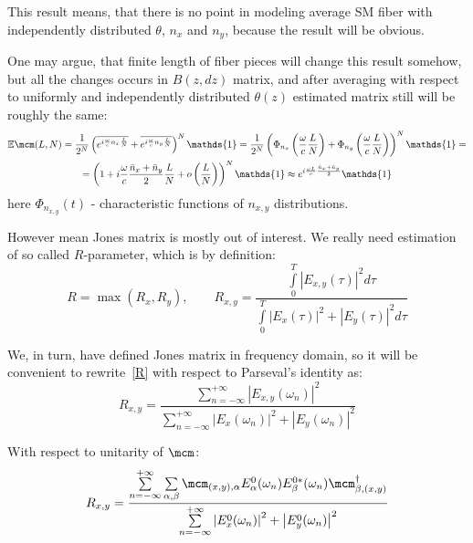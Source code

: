 \documentclass[12pt, notitlepage]{report}
\begin{document}
\label{problem}
This result means, that there is no point in modeling average SM fiber with independently distributed $\theta$, $n_x$ and $n_y$, because the result will be obvious. 

One may argue, that finite length of fiber pieces will change this result somehow, but all the changes occurs in $B(z,dz)$ matrix, and after averaging with respect to uniformly and independently distributed $\theta(z)$ estimated matrix still will be roughly the same:
\begin{multline*}
	\mathbb{E}\mcm(L, N) = \dfrac{1}{2^N} \left( \overline{e^{i\frac{\omega}{c}n_x\frac{L}{N}}} + \overline{e^{i\frac{\omega}{c}n_y\frac{L}{N}}}\right)^N \mathds{1} = \dfrac{1}{2^N} \left( \Phi_{n_x}\left(\frac{\omega}{c}\frac{L}{N}\right) + \Phi_{n_y}\left(\frac{\omega}{c}\frac{L}{N}\right)\right)^N \mathds{1}= \\
	= \left( 1 + i\dfrac{\omega}{c}\dfrac{\bar{n}_x+\bar{n}_y}{2}\dfrac{L}{N} + o\left(\dfrac{L}{N}\right)\right)^N  \mathds{1} \approx e^{i\frac{\omega L}{c}\frac{\bar{n}_x + \bar{n}_y}{2}}\mathds{1}
\end{multline*}
here $\Phi_{n_{x,y}}(t)$ - characteristic functions of $n_{x,y}$ distributions.

However mean Jones matrix is mostly out of interest. We really need estimation of so called $R$-parameter, which is by definition:
\begin{equation}
	\label{R}
	R = \max (R_x, R_y),\qquad
R_{x,y} = \dfrac{\int\limits_0^T\left|E_{x,y}(\tau)\right|^2d\tau}{\int\limits_0^T\left|E_x(\tau)\right|^2 + \left|E_y(\tau)\right|^2d\tau}
\end{equation}

We, in turn, have defined Jones matrix in frequency domain, so it will be convenient to rewrite~\eqref{R} with respect to Parseval's identity as:
\begin{equation*}
R_{x,y} = \frac{\sum\limits_{n=-\infty}^{+\infty} \left|E_{x,y}(\omega_n)\right|^2}{\sum\limits_{n=-\infty}^{+\infty} \left|E_x(\omega_n)\right|^2 + \left|E_y(\omega_n)\right|^2}
\end{equation*}

With respect to unitarity of $\mcm$:
\begin{equation*}
	R_{x,y} = \frac{\sum\limits_{n=-\infty}^{+\infty}\sum\limits_{\alpha,\beta} \mcm_{(x,y),\alpha}E^0_\alpha(\omega_n) E^{0*}_\beta(\omega_n) \mcm^\dagger_{\beta,(x,y)}}{\sum\limits_{n=-\infty}^{+\infty} \left|E_x^0(\omega_n)\right|^2 + \left|E_y^0(\omega_n)\right|^2}
\end{equation*}
\end{document}
